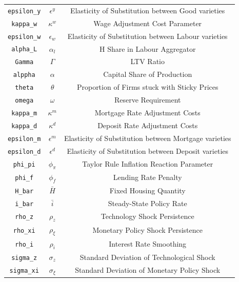 \begin{center}
\begin{longtable}{ccc}
\texttt{epsilon\_y} & $\epsilon^y$ & Elasticity of Substitution between Good varieties\\
\texttt{kappa\_w} & $\kappa^w$ & Wage Adjustment Cost Parameter\\
\texttt{epsilon\_w} & $\epsilon_w$ & Elasticity of Substitution between Labour varieties\\
\texttt{alpha\_L} & $\alpha_l$ & H Share in Labour Aggregator\\
\texttt{Gamma} & $\Gamma$ & LTV Ratio\\
\texttt{alppha} & $\alpha$ & Capital Share of Production\\
\texttt{theta} & $\theta$ & Proportion of Firms stuck with Sticky Prices\\
\texttt{omega} & $\omega$ & Reserve Requirement\\
\texttt{kappa\_m} & $\kappa^m$ & Mortgage Rate Adjustment Costs\\
\texttt{kappa\_d} & $\kappa^d$ & Deposit Rate Adjustment Costs\\
\texttt{epsilon\_m} & $\epsilon^m$ & Elasticity of Substitution between Mortgage varieties\\
\texttt{epsilon\_d} & $\epsilon^d$ & Elasticity of Substitution between Deposit varieties\\
\texttt{phi\_pi} & $\phi_\pi$ & Taylor Rule Inflation Reaction Parameter\\
\texttt{phi\_f} & $\phi_f$ & Lending Rate Penalty\\
\texttt{H\_bar} & $\bar{H}$ & Fixed Housing Quantity\\
\texttt{i\_bar} & $\bar{i}$ & Steady-State Policy Rate\\
\texttt{rho\_z} & $\rho_z$ & Technology Shock Persistence\\
\texttt{rho\_xi} & $\rho_\xi$ & Monetary Policy Shock Persistence\\
\texttt{rho\_i} & $\rho_i$ & Interest Rate Smoothing\\
\texttt{sigma\_z} & $\sigma_z$ & Standard Deviation of Technological Shock\\
\texttt{sigma\_xi} & $\sigma_\xi$ & Standard Deviation of Monetary Policy Shock\\
\hline%
\end{longtable}
\end{center}
